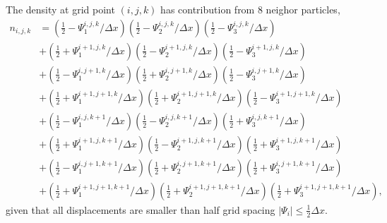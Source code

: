 \documentclass[a4paper,11pt]{article}
\begin{document}
The density at grid point $(i, j, k)$ has contribution from 8 neighor particles,
\begin{equation}
  \label{eq:n-nonlinear}
\begin{split}
  n_{i,j,k} &= \left( \frac{1}{2} - \Psi_1^{i,   j,   k  }/\Delta x \right)
              \left( \frac{1}{2} - \Psi_2^{i,   j,   k  }/\Delta x \right)
              \left( \frac{1}{2} - \Psi_3^{i,   j,   k  }/\Delta x \right)\\
           &+ \left( \frac{1}{2} + \Psi_1^{i+1, j,   k  }/\Delta x \right)
              \left( \frac{1}{2} - \Psi_2^{i+1, j,   k  }/\Delta x \right)
              \left( \frac{1}{2} - \Psi_3^{i+1, j,   k  }/\Delta x \right)\\
           &+ \left( \frac{1}{2} - \Psi_1^{i,   j+1, k  }/\Delta x \right)
              \left( \frac{1}{2} + \Psi_2^{i,   j+1, k  }/\Delta x \right)
              \left( \frac{1}{2} - \Psi_3^{i,   j+1, k  }/\Delta x \right)\\
           &+ \left( \frac{1}{2} + \Psi_1^{i+1, j+1, k  }/\Delta x \right)
              \left( \frac{1}{2} + \Psi_2^{i+1, j+1, k  }/\Delta x \right)
              \left( \frac{1}{2} - \Psi_3^{i+1, j+1, k  }/\Delta x \right)\\
           &+ \left( \frac{1}{2} - \Psi_1^{i,   j  , k+1}/\Delta x \right)
              \left( \frac{1}{2} - \Psi_2^{i,   j  , k+1}/\Delta x \right)
              \left( \frac{1}{2} + \Psi_3^{i,   j  , k+1}/\Delta x \right)\\
           &+ \left( \frac{1}{2} + \Psi_1^{i+1, j  , k+1}/\Delta x \right)
              \left( \frac{1}{2} - \Psi_2^{i+1, j  , k+1}/\Delta x \right)
              \left( \frac{1}{2} + \Psi_3^{i+1, j  , k+1}/\Delta x \right)\\
           &+ \left( \frac{1}{2} - \Psi_1^{i,   j+1, k+1}/\Delta x \right)
              \left( \frac{1}{2} + \Psi_2^{i,   j+1, k+1}/\Delta x \right)
              \left( \frac{1}{2} + \Psi_3^{i,   j+1, k+1}/\Delta x \right)\\
           &+ \left( \frac{1}{2} + \Psi_1^{i+1, j+1, k+1}/\Delta x \right)
              \left( \frac{1}{2} + \Psi_2^{i+1, j+1, k+1}/\Delta x \right)
              \left( \frac{1}{2} + \Psi_3^{i+1, j+1, k+1}/\Delta x \right),
\end{split}
\end{equation}
given that all displacements are smaller than half grid spacing
$|\Psi_i| \le \frac{1}{2} \Delta x$.
\end{document}
